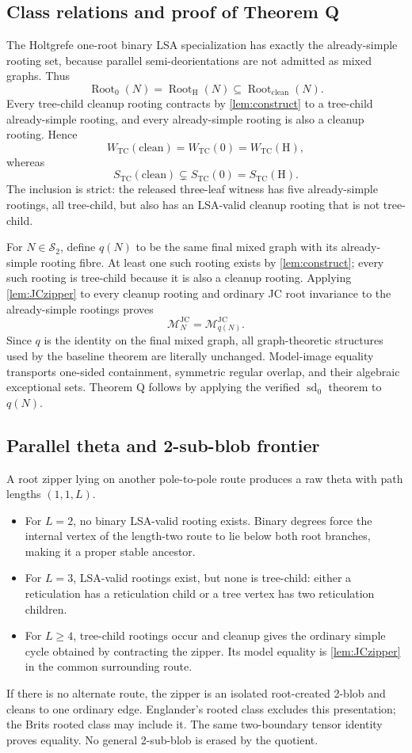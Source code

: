 \documentclass[11pt]{article}
\theoremstyle{remark}\newtheorem{remark}[theorem]{Remark}
\newcommand{\STC}{S_{\mathrm{TC}}}
\newcommand{\WTC}{W_{\mathrm{TC}}}
\newcommand{\JC}{\mathrm{JC}}
\newcommand{\M}{\mathcal M}
\begin{document}
\subsection{Class relations and proof of Theorem Q}
The Holtgrefe one-root binary LSA specialization has exactly the already-simple rooting set, because parallel semi-deorientations are not admitted as mixed graphs.  Thus
\[
\operatorname{Root}_0(N)=\operatorname{Root}_{\mathrm H}(N)
\subseteq \operatorname{Root}_{\mathrm{clean}}(N).
\]
Every tree-child cleanup rooting contracts by \cref{lem:construct} to a tree-child already-simple rooting, and every already-simple rooting is also a cleanup rooting.  Hence
\[
\WTC(\mathrm{clean})=\WTC(0)=\WTC(\mathrm H),
\]
whereas
\[
\STC(\mathrm{clean})\subsetneq \STC(0)=\STC(\mathrm H).
\]
The inclusion is strict: the released three-leaf witness has five already-simple rootings, all tree-child, but also has an LSA-valid cleanup rooting that is not tree-child.

For $N\in\mathcal S_2$, define $q(N)$ to be the same final mixed graph with its already-simple rooting fibre.  At least one such rooting exists by \cref{lem:construct}; every such rooting is tree-child because it is also a cleanup rooting.  Applying \cref{lem:JCzipper} to every cleanup rooting and ordinary JC root invariance to the already-simple rootings proves
\[
\M_N^{\JC}=\M_{q(N)}^{\JC}.
\]
Since $q$ is the identity on the final mixed graph, all graph-theoretic structures used by the baseline theorem are literally unchanged.  Model-image equality transports one-sided containment, symmetric regular overlap, and their algebraic exceptional sets.  Theorem Q follows by applying the verified $\operatorname{sd}_0$ theorem to $q(N)$.

\subsection{Parallel theta and 2-sub-blob frontier}
A root zipper lying on another pole-to-pole route produces a raw theta with path lengths $(1,1,L)$.
\begin{itemize}
\item For $L=2$, no binary LSA-valid rooting exists.  Binary degrees force the internal vertex of the length-two route to lie below both root branches, making it a proper stable ancestor.
\item For $L=3$, LSA-valid rootings exist, but none is tree-child: either a reticulation has a reticulation child or a tree vertex has two reticulation children.
\item For $L\ge4$, tree-child rootings occur and cleanup gives the ordinary simple cycle obtained by contracting the zipper.  Its model equality is \cref{lem:JCzipper} in the common surrounding route.
\end{itemize}
If there is no alternate route, the zipper is an isolated root-created 2-blob and cleans to one ordinary edge.  Englander's rooted class excludes this presentation; the Brits rooted class may include it.  The same two-boundary tensor identity proves equality.  No general 2-sub-blob is erased by the quotient.
\end{document}
